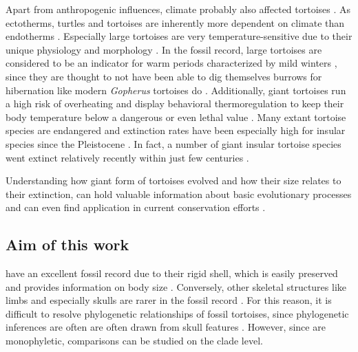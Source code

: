 Apart from anthropogenic influences, climate probably also affected tortoises \citep{.}. 
As ectotherms, turtles and tortoises are inherently more dependent on climate than endotherms \citep{Delfino2003}. Especially large tortoises are very temperature-sensitive due to their unique physiology and morphology \citep{Swingland1979a, Swingland1979b}. In the fossil record, large tortoises are considered to be an indicator for warm periods characterized by mild winters \citep{Hibbard1960,Schleich1981}, since they are thought to not have been able to dig themselves burrows for hibernation like modern \textit{Gopherus} tortoises do %
\citep{Carlson1999, Stojanov2009}. Additionally, giant tortoises run a high risk of overheating and display behavioral thermoregulation to keep their body temperature below a dangerous or even lethal value \citep{Sturbaum1982, Schleich1981}.
Many extant tortoise species are endangered and extinction rates have been especially high for insular species since the Pleistocene \citep{Rhodin2015}.
In fact, a number of giant insular tortoise species went extinct relatively recently within just few centuries \citep{.}.

Understanding how giant form of tortoises evolved and how their size relates to their extinction, can hold valuable information about basic evolutionary processes and can even find application in current conservation efforts \citep{Hansen2010}.




 

\subsection{Aim of this work}

\T have an excellent fossil record due to their rigid shell, which is easily preserved and provides information on body size \citep{.}. Conversely, other skeletal structures like limbs and especially skulls are rarer in the fossil record \citep{.}.
For this reason, it is difficult to resolve phylogenetic relationships of fossil tortoises, since phylogenetic inferences are often are often drawn from skull features \citep{.}. However, since \T are monophyletic, comparisons can be studied on the clade level.

